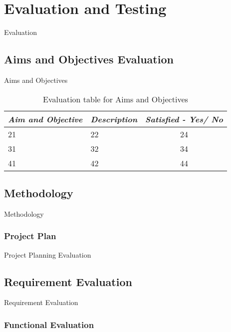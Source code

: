 \chapter{Evaluation and Testing}

Evaluation

\section{Aims and Objectives Evaluation}

Aims and Objectives

\begin{table}[H]
    \centering
    \begin{tabular}{lll}
    \hline
    \multicolumn{1}{|l|}{\textit{\textbf{Aim and Objective}}} & \multicolumn{1}{l|}{\textit{\textbf{Description}}} & \multicolumn{1}{l|}{\textit{\textbf{Satisfied - Yes/ No}}} \\ \hline
    21 & 22 & \multicolumn{1}{c|}{24} \\
    31 & 32 & \multicolumn{1}{c|}{34} \\
    41 & 42 & \multicolumn{1}{c|}{44} \\ \hline
    \end{tabular}
    \caption{Evaluation table for Aims and Objectives}
    \label{tab:EvaluationAimsAndObjectives}
\end{table}

\section{Methodology}

Methodology

\subsection{Project Plan}

Project Planning Evaluation

\section{Requirement Evaluation}

Requirement Evaluation

\subsection{Functional Evaluation}

